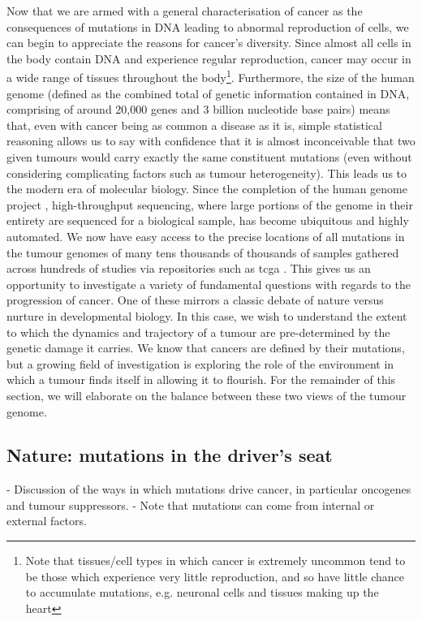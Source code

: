 \documentclass[../thesis.tex]{subfiles}
\begin{document}
Now that we are armed with a general characterisation of cancer as the consequences of mutations in DNA leading to abnormal reproduction of cells, we can begin to appreciate the reasons for cancer's diversity. Since almost all cells in the body contain DNA and experience regular reproduction, cancer may occur in a wide range of tissues throughout the body\footnote{Note that tissues/cell types in which cancer is extremely uncommon tend to be those which experience very little reproduction, and so have little chance to accumulate mutations, e.g. neuronal cells and tissues making up the heart}. Furthermore, the size of the human genome (defined as the combined total of genetic information contained in DNA, comprising of around 20,000 genes and 3 billion nucleotide base pairs) means that, even with cancer being as common a disease as it is, simple statistical reasoning allows us to say with confidence that it is almost inconceivable that two given tumours would carry exactly the same constituent mutations (even without considering complicating factors such as tumour heterogeneity). This leads us to the modern era of molecular biology. Since the completion of the human genome project \citep{lander_initial_2001}, high-throughput sequencing, where large portions of the genome in their entirety are sequenced for a biological sample, has become ubiquitous and highly automated. We now have easy access to the precise locations of all mutations in the tumour genomes of many tens thousands of thousands of samples gathered across hundreds of studies via repositories such as \acrfull{tcga} \citep{weinstein_cancer_2013}. This gives us an opportunity to investigate a variety of fundamental questions with regards to the progression of cancer. One of these mirrors a classic debate of nature versus nurture in developmental biology. In this case, we wish to understand the extent to which the dynamics and trajectory of a tumour are pre-determined by the genetic damage it carries. We know that cancers are defined by their mutations, but a growing field of investigation is exploring the role of the environment in which a tumour finds itself in allowing it to flourish. For the remainder of this section, we will elaborate on the balance between these two views of the tumour genome.
\subsection{Nature: mutations in the driver's seat}
- Discussion of the ways in which mutations drive cancer, in particular oncogenes and tumour suppressors.
- Note that mutations can come from internal or external factors.
\end{document}
